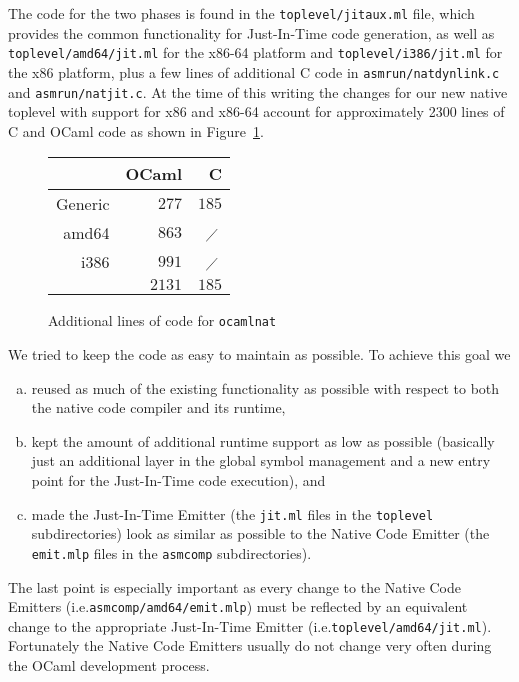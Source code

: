 \documentclass[10pt,a4paper,draft,twocolumn]{article}
\makeatletter
\newcommand{\ie}{i.e.\@\xspace}
\makeatother
\begin{document}
The code for the two phases is found in the \texttt{toplevel/jitaux.ml} file, which provides the common
functionality for Just-In-Time code generation, as well as \texttt{toplevel/amd64/jit.ml} for the x86-64
platform and \texttt{toplevel/i386/jit.ml} for the x86 platform, plus a few lines of additional C code in
\texttt{asmrun/natdynlink.c} and \texttt{asmrun/natjit.c}. At the time of this writing the changes for our
new native toplevel with support for x86 and x86-64 account for approximately 2300 lines of C and OCaml
code as shown in Figure~\ref{fig:Additional_lines_of_code_for_ocamlnat}.

\begin{figure}[htb]
  \centering
  \begin{tabular}{r|rr}
    & OCaml & C \\
    \hline
    Generic & $277$ & $185$ \\
    amd64 & $863$ & $\diagup$\, \\
    i386 & $991$ & $\diagup$\, \\
    \hline
    & $2131$ & $185$ \\
  \end{tabular}
  \caption{Additional lines of code for \texttt{ocamlnat}}
  \label{fig:Additional_lines_of_code_for_ocamlnat}
\end{figure}

We tried to keep the code as easy to maintain as possible. To achieve this goal we
\begin{enumerate}[(a)]
\item reused as much of the existing functionality as possible with respect to both the native code compiler and
  its runtime,
\item kept the amount of additional runtime support as low as possible (basically just an additional layer in
  the global symbol management and a new entry point for the Just-In-Time code execution), and
\item made the Just-In-Time Emitter (the \texttt{jit.ml} files in the \texttt{toplevel} subdirectories) look as
  similar as possible to the Native Code Emitter (the \texttt{emit.mlp} files in the \texttt{asmcomp}
  subdirectories).
\end{enumerate}
The last point is especially important as every change to the Native Code Emitters
(\ie \texttt{asmcomp/amd64/emit.mlp}) must be reflected by an equivalent change to the appropriate
Just-In-Time Emitter (\ie \texttt{toplevel/amd64/jit.ml}). Fortunately the Native Code Emitters usually
do not change very often during the OCaml development process.
\end{document}
